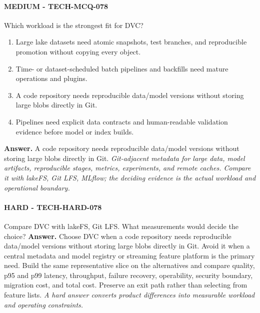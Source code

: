 \paragraph{MEDIUM - TECH-MCQ-078} Which workload is the strongest fit for DVC?
\begin{enumerate}[label=\Alph*.]
\item Large lake datasets need atomic snapshots, test branches, and reproducible promotion without copying every object.
\item Time- or dataset-scheduled batch pipelines and backfills need mature operations and plugins.
\item A code repository needs reproducible data/model versions without storing large blobs directly in Git.
\item Pipelines need explicit data contracts and human-readable validation evidence before model or index builds.
\end{enumerate}
\textbf{Answer.} A code repository needs reproducible data/model versions without storing large blobs directly in Git.
\textit{Git-adjacent metadata for large data, model artifacts, reproducible stages, metrics, experiments, and remote caches. Compare it with lakeFS, Git LFS, MLflow; the deciding evidence is the actual workload and operational boundary.}
\paragraph{HARD - TECH-HARD-078} Compare DVC with lakeFS, Git LFS. What measurements would decide the choice?
\textbf{Answer.} Choose DVC when a code repository needs reproducible data/model versions without storing large blobs directly in Git. Avoid it when a central metadata and model registry or streaming feature platform is the primary need. Build the same representative slice on the alternatives and compare quality, p95 and p99 latency, throughput, failure recovery, operability, security boundary, migration cost, and total cost. Preserve an exit path rather than selecting from feature lists.
\textit{A hard answer converts product differences into measurable workload and operating constraints.}
